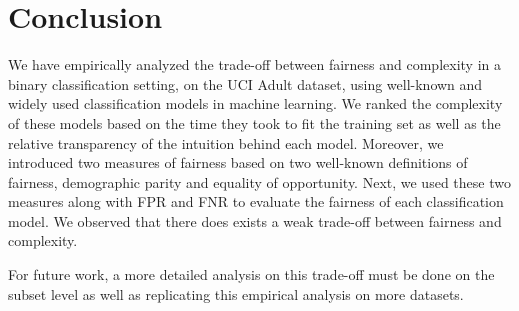 \section{Conclusion}
We have empirically analyzed the trade-off between fairness and complexity in a binary classification setting, on the UCI Adult dataset, using well-known and widely used classification models in machine learning. We ranked the complexity of these models based on the time they took to fit the training set as well as the relative transparency of the intuition behind each model. Moreover, we introduced two measures of fairness based on two well-known definitions of fairness, demographic parity and equality of opportunity. Next, we used these two measures along with FPR and FNR to evaluate the fairness of each classification model. We observed that there does exists a weak trade-off between fairness and complexity. 

For future work, a more detailed analysis on this trade-off must be done on the subset level as well as replicating this empirical analysis on more datasets.